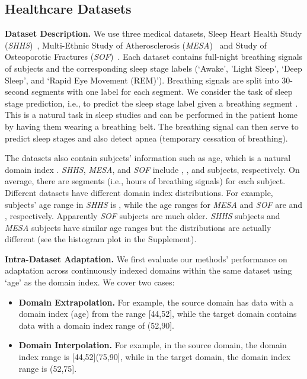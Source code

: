 \documentclass{article}
\newenvironment{Itemize}{\begin{itemize}\setlength{\itemsep}{0pt}\setlength{\topsep}{0pt}\setlength{\partopsep}{0pt}\setlength{\parskip}{0pt}}{\end{itemize}}
\begin{document}
\subsection{Healthcare Datasets}
\textbf{Dataset Description.}
We use three medical datasets, Sleep Heart Health Study (\emph{SHHS})~\cite{SHHS}, Multi-Ethnic Study of Atherosclerosis (\emph{MESA})~\cite{MESA} and Study of Osteoporotic Fractures (\emph{SOF})~\cite{SOF}. Each dataset contains full-night breathing signals of subjects and the corresponding sleep stage labels (`Awake', 'Light Sleep', `Deep Sleep', and `Rapid Eye Movement (REM)'). Breathing signals are split into 30-second segments with one label for each segment. We consider the task of sleep stage prediction, i.e., to predict the sleep stage label  given a breathing segment . This is a natural task in sleep studies and can be performed in the patient home by having them wearing a breathing belt. The breathing signal can then serve to predict sleep stages and also detect apnea (temporary cessation of breathing).

The datasets also contain subjects' information such as age, which is a natural domain index . \emph{SHHS}, \emph{MESA}, and \emph{SOF} include , , and  subjects, respectively. On average, there are  segments (i.e.,  hours of breathing signals) for each subject. Different datasets have different domain index distributions. For example, subjects' age range in \emph{SHHS} is , while the age ranges for \emph{MESA} and \emph{SOF} are  and , respectively. Apparently \emph{SOF} subjects are much older. \emph{SHHS} subjects and \emph{MESA} subjects have similar age ranges but the distributions are actually different (see the histogram plot in the Supplement).


\textbf{Intra-Dataset Adaptation.} We first evaluate our methods' performance on adaptation across continuously indexed domains within the same dataset using `age' as the domain index. We cover two cases:
\begin{Itemize}
\item \textbf{Domain Extrapolation.} For example, the source domain has data with a domain index (age) from the range [44,52], while the target domain contains data with a domain index range of (52,90]. 
\item \textbf{Domain Interpolation.} For example, in the source domain, the domain index range is [44,52](75,90], while in the target domain, the domain index range is (52,75]. 
\end{Itemize}
\end{document}
